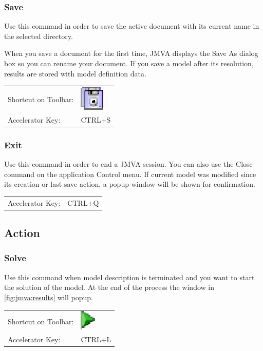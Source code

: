 \subsubsection{Save}
Use this command in order to save the active document with its
current name in the selected directory.

When you save a document for the first time, JMVA displays the Save
As dialog box so you can rename your document. If you save a model
after its resolution, results are stored with model definition data.

\noindent
\begin{tabular}{ll}
Shortcut on Toolbar: & \includegraphics[scale=.8]{img/jmva/save}\\
Accelerator Key: & CTRL+S
\end{tabular}

\subsubsection{Exit}
Use this command in order to end a JMVA session. You can also use
the Close command on the application Control menu. If current model
was modified since its creation or last save action, a popup window
will be shown for confirmation.

\noindent
\begin{tabular}{ll}
\\
Accelerator Key: & CTRL+Q
\end{tabular}

\subsection{Action}
\subsubsection{Solve}
Use this command when model description is terminated and you want
to start the solution of the model. At the end of the process the
window in \autoref{fig:jmva:results} will popup.

\noindent
\begin{tabular}{ll}
Shortcut on Toolbar: & \includegraphics[scale=.8]{img/jmva/solve}\\
Accelerator Key: & CTRL+L
\end{tabular}

